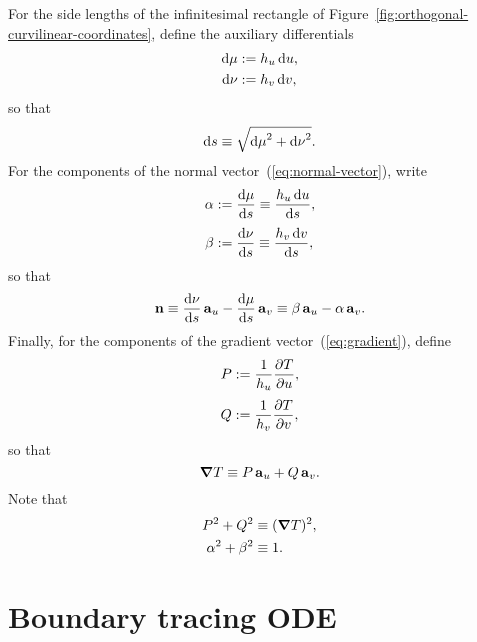 For the side lengths of the infinitesimal rectangle
of Figure~\ref{fig:orthogonal-curvilinear-coordinates},
define the auxiliary differentials
\begin{align}
  \td \mu &\defeq \scalefac[u] \td u,
    \label{eq:differential-displacement-u-component} \\
  \td \nu &\defeq \scalefac[v] \td v,
    \label{eq:differential-displacement-v-component}
\end{align}
so that
\begin{equation}
  \mathop{}\!\mathrm{d} s \equiv \sqrt{{\mathop{}\!\mathrm{d} \mu}^2 + {\mathop{}\!\mathrm{d} \nu}^2}.
  \label{eq:differential-arc-length-abbreviated}
\end{equation}
For the components of the normal vector~(\ref{eq:normal-vector}),
write
\begin{align}
  \alpha &\defeq \tder{\mu}{s} \ideq \frac{\scalefac[u] \td u}{\td s},
    \label{eq:tangent-u-component} \\[\tallspace]
  \beta &\defeq \tder{\nu}{s} \ideq \frac{\scalefac[v] \td v}{\td s},
    \label{eq:tangent-v-component}
\end{align}
so that
\begin{equation}
  \normalvec
    \ideq \tder{\nu}{s} \basisvec{u} - \tder{\mu}{s} \basisvec{v}
    \ideq \beta \basisvec{u} - \alpha \basisvec{v}.
  \label{eq:normal-vector-abbreviated}
\end{equation}
Finally, for the components of the gradient vector~(\ref{eq:gradient}),
define
\begin{align}
  P &\defeq \frac{1}{\scalefac[u]} \pder{T}{u},
    \label{eq:gradient-u-component} \\[\tallspace]
  Q &\defeq \frac{1}{\scalefac[v]} \pder{T}{v},
    \label{eq:gradient-v-component}
\end{align}
so that
\begin{equation}
  \mathop{}\!\boldsymbol{\mathbf{\nabla}} T \equiv P \mathop{}\!\boldsymbol{\mathbf{a}}_{u} + Q \mathop{}\!\boldsymbol{\mathbf{a}}_{v}.
  \label{eq:gradient-abbreviated}
\end{equation}
Note that
\begin{align}
  P^2 + Q^2 &\equiv (\mathop{}\!\boldsymbol{\mathbf{\nabla}} T)^2, \label{eq:gradient-pythagoras} \\
  \alpha^2 + \beta^2 &\equiv 1. \label{eq:tangent-pythagoras}
\end{align}

\section{Boundary tracing ODE}
\label{sec:curvilinear.tracing}

